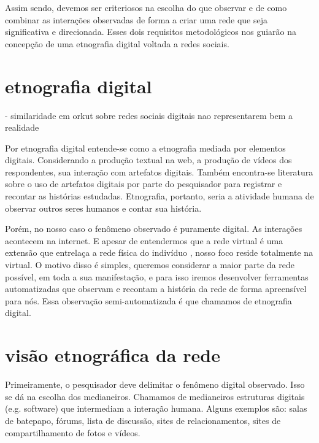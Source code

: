 \documentclass{article}
\begin{document}
Assim sendo, devemos ser criteriosos na escolha do que observar e de como
combinar as interações observadas de forma a criar uma rede que seja
significativa e direcionada. Esses dois requisitos metodológicos nos guiarão na
concepção de uma etnografia digital voltada a redes sociais.

\section{etnografia digital}

\cite{Spertus2005} - similaridade em orkut
\cite{Clemons2007} sobre redes sociais digitais nao representarem bem a
realidade



Por etnografia digital entende-se como a etnografia mediada por elementos
digitais. Considerando a produção textual na web, a produção de vídeos dos
respondentes, sua interação com artefatos digitais. Também encontra-se
literatura sobre o uso de artefatos digitais por parte do pesquisador para
registrar e recontar as histórias estudadas. Etnografia, portanto, seria a
atividade humana de observar outros seres humanos e contar sua história. 

Porém, no nosso caso o fenômeno observado é puramente digital. As interações
acontecem na internet. E apesar de entendermos que a rede virtual é uma extensão
que entrelaça a rede física do indivíduo \cite{Haythornthwaite2005}, nosso foco
reside totalmente na virtual. O motivo disso é simples, queremos considerar a maior parte da rede
possível, em toda a sua manifestação, e para isso iremos desenvolver ferramentas
automatizadas que observam e recontam a história da rede de forma apreensível
para nós. Essa observação semi-automatizada é que chamamos de etnografia
digital.

\section{visão etnográfica da rede}

Primeiramente, o pesquisador deve delimitar o fenômeno digital observado. Isso
se dá na escolha dos medianeiros. Chamamos de medianeiros estruturas digitais
(e.g. software) que intermediam a interação humana. Alguns exemplos são: salas
de batepapo, fórums, lista de discussão, sites de relacionamentos, sites de
compartilhamento de fotos e vídeos.
\end{document}
